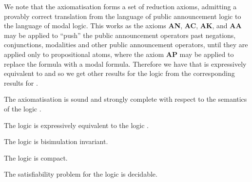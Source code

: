 We note that the axiomatisation \axiomPalS{} forms a set of reduction axioms, admitting a provably correct translation from the language \langPal{} of public announcement logic to the language \langMl{} of modal logic.
This works as the axioms {\bf AN}, {\bf AC}, {\bf AK}, and {\bf AA} may be applied to ``push'' the public announcement operators past negations, conjunctions, modalities and other public announcement operators, until they are applied only to propositional atoms, where the axiom {\bf AP} may be applied to replace the formula with a modal formula.
Therefore we have that \logicPalS{} is expressively equivalent to \logicS{} and so we get other results for the logic from the corresponding results for \logicS{}.

\begin{proposition}
The axiomatisation \axiomPalS{} is sound and strongly complete with respect to the semantics of the logic \logicPalS{}.
\end{proposition}

\begin{proposition}
The logic \logicPalS{} is expressively equivalent to the logic \logicS{}.
\end{proposition}

\begin{proposition}
The logic \logicPalS{} is bisimulation invariant.
\end{proposition}

\begin{proposition}
The logic \logicPalS{} is compact.
\end{proposition}

\begin{proposition}
The satisfiability problem for the logic \logicPalS{} is decidable.
\end{proposition}
